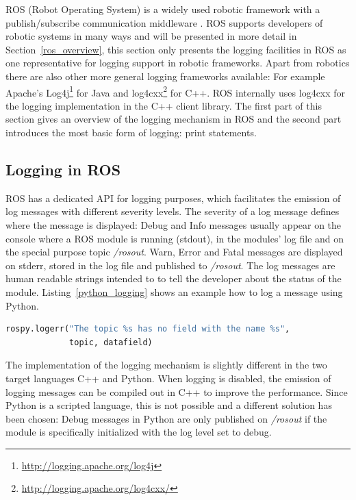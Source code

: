 ROS (Robot Operating System) is a widely used robotic framework \cite{Foote2012} with a publish/subscribe communication middleware \cite{Quigley2009}. ROS supports developers of robotic systems in many ways and will be presented in more detail in Section~\ref{ros_overview}, this section only presents the logging facilities in ROS as one representative for logging support in robotic frameworks. Apart from robotics there are also other more general logging frameworks available: For example Apache's Log4j\footnote{\url{http://logging.apache.org/log4j}} for Java and log4cxx\footnote{\url{http://logging.apache.org/log4cxx/}} for C++. ROS internally uses log4cxx for the logging implementation in the C++ client library. The first part of this section gives an overview of the logging mechanism in ROS and the second part introduces the most basic form of logging: print statements.

\subsection{Logging in ROS}
\label{ros_logging}

ROS has a dedicated API for logging purposes, which facilitates the emission of log messages with different severity levels. The severity of a log message defines where the message is displayed: Debug and Info messages usually appear on the console where a ROS module is running (stdout), in the modules' log file and on the special purpose topic \emph{/rosout}. Warn, Error and Fatal messages are displayed on stderr, stored in the log file and published to \emph{/rosout}. The log messages are human readable strings intended to to tell the developer about the status of the module. Listing~\ref{python_logging} shows an example how to log a message using Python.

\begin{lstlisting}[frame=single,caption={ROS logging example in Python.},label=python_logging,language=Python]
rospy.logerr("The topic %s has no field with the name %s",
             topic, datafield)
\end{lstlisting}

The implementation of the logging mechanism is slightly different in the two target languages C++ and Python. When logging is disabled, the emission of logging messages can be compiled out in C++ to improve the performance. Since Python is a scripted language, this is not possible and a different solution has been chosen: Debug messages in Python are only published on \emph{/rosout} if the module is specifically initialized with the log level set to debug.

